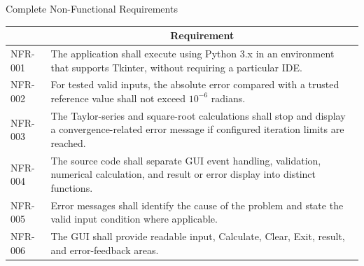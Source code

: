 \documentclass[aspectratio=169]{beamer}
\newcommand{\tableheader}[1]{%
    \multicolumn{1}{c}{\color{white}\textbf{#1}}%
}
\begin{document}
\begin{frame}{Complete Non-Functional Requirements}
\scriptsize
{}
\begin{tabular}{p{}p{}}
\rowcolor{navy}
\tableheader{ID} & \tableheader{Requirement} \\
\toprule
NFR-001 & The application shall execute using Python 3.x in an environment that supports Tkinter, without requiring a particular IDE. \\
NFR-002 & For tested valid inputs, the absolute error compared with a trusted reference value shall not exceed \(10^{-6}\) radians. \\
NFR-003 & The Taylor-series and square-root calculations shall stop and display a convergence-related error message if configured iteration limits are reached. \\
NFR-004 & The source code shall separate GUI event handling, validation, numerical calculation, and result or error display into distinct functions. \\
NFR-005 & Error messages shall identify the cause of the problem and state the valid input condition where applicable. \\
NFR-006 & The GUI shall provide readable input, Calculate, Clear, Exit, result, and error-feedback areas. \\
\bottomrule
\end{tabular}
\end{frame}
\end{document}
